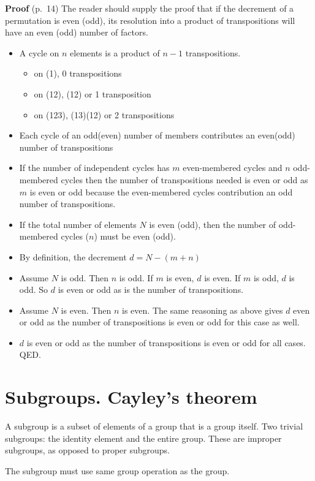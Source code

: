 {\bf Proof} (p.\ 14) The reader should supply the proof that if the
decrement of a permutation is even (odd), its resolution into a product
of transpositions will have an even (odd) number of factors.
\begin{itemize}
\item A cycle on $n$ elements is a product of $n-1$ transpositions.
  \begin{itemize}
  \item on (1), 0 transpositions
  \item on (12), (12) or 1 transposition
  \item on (123), (13)(12) or 2 transpositions
  \end{itemize}
\item Each cycle of an odd(even) number of members contributes an
  even(odd) number of transpositions
\item If the number of independent cycles has $m$ even-membered cycles
  and $n$ odd-membered cycles then the number of transpositions needed
  is even or odd as $m$ is even or odd because the even-membered
  cycles contribution an odd number of transpositions.
\item If the total number of elements $N$ is even (odd), then the
  number of odd-membered cycles ($n$) must be even (odd).
\item By definition, the decrement $d = N-(m+n)$
\item Assume $N$ is odd. Then $n$ is odd. If $m$ is even, $d$ is
  even. If $m$ is odd, $d$ is odd. So $d$ is even or odd as is the
  number of transpositions.
\item Assume $N$ is even. Then $n$ is even. The same reasoning as
  above gives $d$ even or odd as the number of transpositions is even
  or odd for this case as well.
\item $d$ is even or odd as the number of transpositions is even or
  odd for all cases. QED.
\end{itemize}

\section{Subgroups. Cayley's theorem}

A subgroup is a subset of elements of a group that is a group
itself. Two trivial subgroups: the identity element and the entire
group. These are improper subgroups, as opposed to proper subgroups.

The subgroup must use same group operation as the group.


